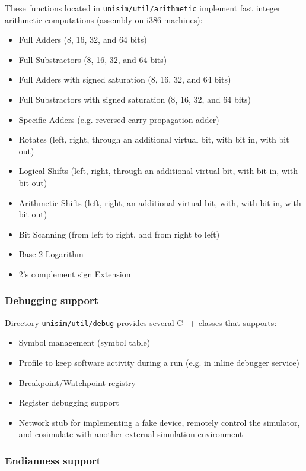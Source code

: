 These functions located in \texttt{unisim/util/arithmetic} implement fast integer arithmetic computations (assembly on i386 machines):
\begin{itemize}
\item Full Adders (8, 16, 32, and 64 bits)
\item Full Substractors (8, 16, 32, and 64 bits)
\item Full Adders with signed saturation (8, 16, 32, and 64 bits)
\item Full Substractors with signed saturation (8, 16, 32, and 64 bits)
\item Specific Adders (e.g. reversed carry propagation adder)
\item Rotates (left, right, through an additional virtual bit, with bit in, with bit out)
\item Logical Shifts (left, right, through an additional virtual bit, with bit in, with bit out)
\item Arithmetic Shifts (left, right, an additional virtual bit, with, with bit in, with bit out)
\item Bit Scanning (from left to right, and from right to left)
\item Base 2 Logarithm
\item 2's complement sign Extension
\end{itemize}

\subsubsection{Debugging support}

Directory \texttt{unisim/util/debug} provides several C++ classes that supports:
\begin{itemize}
\item Symbol management (symbol table)
\item Profile to keep software activity during a run (e.g. in inline debugger service)
\item Breakpoint/Watchpoint registry
\item Register debugging support
\item Network stub for implementing a fake device, remotely control the simulator, and cosimulate with another external simulation environment
\end{itemize}

\subsubsection{Endianness support}

